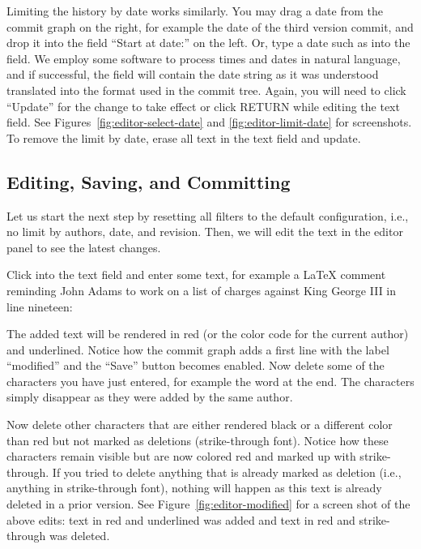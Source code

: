 Limiting the history by date works similarly.  You may drag a date from the commit graph on the right, for example the date of the third version commit, and drop it into the field ``Start at date:'' on the left.  Or, type a date such as  into the field.  We employ some software to process times and dates in natural language, and if successful, the field will contain the date string as it was understood translated into the format used in the commit tree.
Again, you will need to click ``Update'' for the change to take effect or click RETURN while editing the text field.  See Figures~\ref{fig:editor-select-date} and \ref{fig:editor-limit-date} for screenshots. To remove the limit by date, erase all text in the text field and update.

\subsection{Editing, Saving, and Committing}

Let us start the next step by resetting all filters to the default configuration, i.e., no limit by authors, date, and revision.  Then, we will edit the text in the editor panel to see the latest changes.

Click into the text field and enter some text, for example a LaTeX comment reminding John Adams to work on a list of charges against King George III in line nineteen:
\begin{FileVerbatim}
\end{FileVerbatim}
The added text will be rendered in red (or the color code for the current author) and underlined.  Notice how the commit graph adds a first line with the label ``modified'' and the ``Save'' button becomes enabled.  Now delete some of the characters you have just entered, for example the word  at the end.  The characters simply disappear as they were added by the same author.

Now delete other characters that are either rendered black or a different color than red but not marked as deletions (strike-through font).  Notice how these characters remain visible but are now colored red and marked up with strike-through.  If you tried to delete anything that is already marked as deletion (i.e., anything in strike-through font), nothing will happen as this text is already deleted in a prior version.  See Figure~\ref{fig:editor-modified} for a screen shot of the above edits: text in red and underlined was added and text in red and strike-through was deleted.

